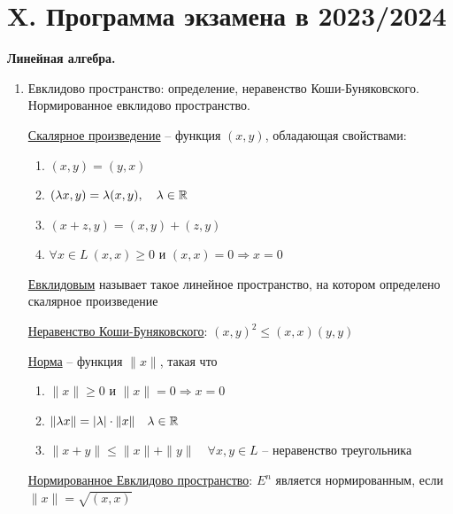 \documentclass[12pt]{article}
\begin{document}
    \clearpage


    \section{X. Программа экзамена в 2023/2024}


    \begin{center}
        \textbf{Линейная алгебра.}
    \end{center}

    \begin{enumerate}
        \item Евклидово пространство: определение, неравенство Коши-Буняковского. Нормированное евклидово пространство.

        \hyperlink{scalarproductdefinition}{Скалярное произведение} -- функция $(x, y)$, обладающая свойствами:

        \begin{enumerate}
            \item $(x, y) = (y, x)$
            \item $(\lambda x, y) = \lambda (x, y), \quad \lambda \in \mathbb{R}$
            \item $(x + z, y) = (x, y) + (z, y)$
            \item $\forall x \in L\ (x, x) \geq 0$ и $(x, x) = 0 \Longrightarrow x = 0$
        \end{enumerate}

        \hyperlink{euclidspacedefinition}{Евклидовым} называет такое линейное пространство, на котором определено скалярное произведение

        \hyperlink{inequalityofCauchyBunyakovsky}{Неравенство Коши-Буняковского}: $(x, y)^2 \leq (x, x)(y, y)$

        \hyperlink{normdefinition}{Норма} -- функция $\|x\|$, такая что

        \begin{enumerate}
            \item $\|x\| \geq 0$ и $\|x\| = 0 \Longrightarrow x = 0$
            \item $\|\lambda x\| = |\lambda| \cdot \|x\| \quad \lambda \in \mathbb{R}$
            \item $\|x + y\| \leq \|x\| + \|y\| \quad \forall x, y \in L$ -- неравенство треугольника
        \end{enumerate}

        \hyperlink{normalizedeuclidspace}{Нормированное Евклидово пространство}: $E^n$ является нормированным, если $\|x\| = \sqrt{(x, x)}$


\end{enumerate}
\end{document}
